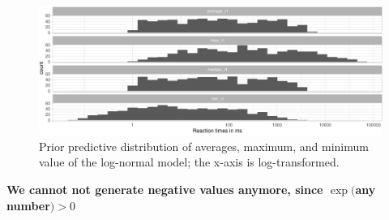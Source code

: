\documentclass[12pt,ignorenonframetext,aspectratio=169]{beamer}
\newenvironment{Shaded}{\begin{snugshade}}{\end{snugshade}}
\newcommand{\DataTypeTok}[1]{\textcolor[rgb]{0.13,0.29,0.53}{#1}}
\newcommand{\DecValTok}[1]{\textcolor[rgb]{0.00,0.00,0.81}{#1}}
\newcommand{\FloatTok}[1]{\textcolor[rgb]{0.00,0.00,0.81}{#1}}
\newcommand{\KeywordTok}[1]{\textcolor[rgb]{0.13,0.29,0.53}{\textbf{#1}}}
\newcommand{\NormalTok}[1]{#1}
\newcommand{\OperatorTok}[1]{\textcolor[rgb]{0.81,0.36,0.00}{\textbf{#1}}}
\newcommand{\StringTok}[1]{\textcolor[rgb]{0.31,0.60,0.02}{#1}}
\begin{document}
\begin{frame}[fragile]

\vspace{.1in}



\scriptsize

\begin{Shaded}
\end{Shaded}

\begin{figure}
\centering
\includegraphics{03-compbayes-slides_files/figure-beamer/priorpredlogunif-1.pdf}
\caption{\label{fig:priorpredlogunif}Prior predictive distribution of averages, maximum, and minimum value of the log-normal model; the x-axis is log-transformed.}
\end{figure}

\normalsize

\textbf{We cannot not generate negative values anymore, since \(\exp(\)any number\() > 0\)}

\end{frame}
\end{document}
